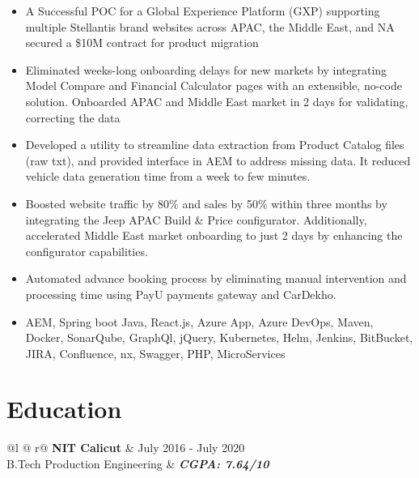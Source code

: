 \documentclass[a4paper,8pt]{article}
\begin{document}
\begin{minipage}[t]{\linewidth}
    \begin{itemize}[nosep,after=\strut, leftmargin=2em, itemsep=3pt]
        \item A Successful POC for a Global Experience Platform (GXP) supporting multiple Stellantis brand websites across APAC, the Middle East, and NA secured a \$10M contract for product migration
        \item Eliminated weeks-long onboarding delays for new markets by integrating Model Compare and Financial Calculator pages with an extensible, no-code solution. Onboarded APAC and Middle East market in 2 days for validating, correcting the data
        \item Developed a utility to streamline data extraction from Product Catalog files (raw txt), and provided interface in AEM to address missing data. It reduced vehicle data generation time from a week to few minutes.
        \item Boosted website traffic by 80\% and sales by 50\% within three months by integrating the Jeep APAC Build \& Price configurator. Additionally, accelerated Middle East market onboarding to just 2 days by enhancing the configurator capabilities.
        \item Automated advance booking process by eliminating manual intervention and processing time using PayU payments gateway and CarDekho.
        \item AEM, Spring boot Java, React.js, Azure App, Azure DevOps, Maven, Docker, SonarQube, GraphQl, jQuery, Kubernetes, Helm, Jenkins, BitBucket, JIRA, Confluence, nx, Swagger, PHP, MicroServices
    \end{itemize}
\end{minipage}\vspace{6pt}

\section{\color[HTML]{0000FF}Education}
\begin{tabularx}{\linewidth}{ @{}l @{\extracolsep{\fill}} r@{} }
\color[HTML]{1C033C} \textbf{NIT Calicut} & \hfill \color[HTML]{371e77} July 2016 - July 2020 \\
\color[HTML]{371e77} B.Tech Production Engineering & \hfill \color[HTML]{4B28A4} \textit{\textbf{CGPA: 7.64/10}} \\
\end{tabularx}
\end{document}

